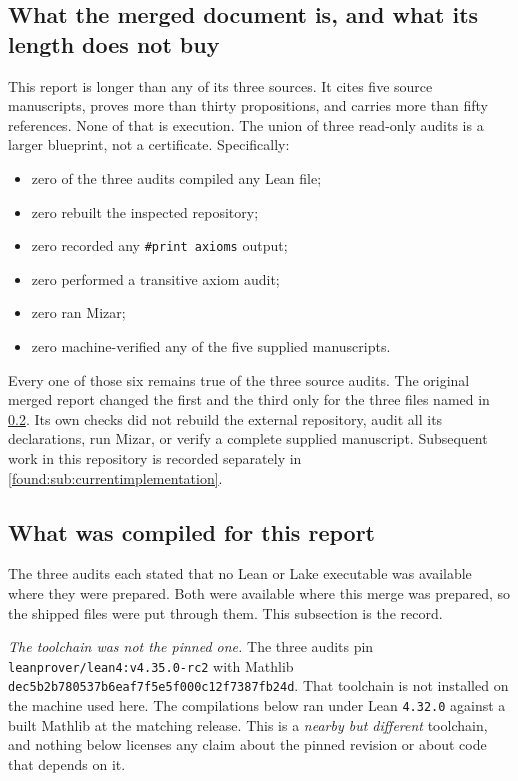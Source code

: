 \documentclass[11pt,letterpaper]{article}
\numberwithin{equation}{section}
\theoremstyle{definition}
\theoremstyle{remark}
\begin{document}
\subsection{What the merged document is, and what its length does not buy}
\label{found:sub:notacertificate}
This report is longer than any of its three sources. It cites five source
manuscripts, proves more than thirty propositions, and carries more than fifty
references. None of that is execution. The union of three read-only audits is a
larger blueprint, not a certificate. Specifically:

\begin{itemize}
\item zero of the three audits compiled any Lean file;
\item zero rebuilt the inspected repository;
\item zero recorded any \texttt{\#print axioms} output;
\item zero performed a transitive axiom audit;
\item zero ran Mizar;
\item zero machine-verified any of the five supplied manuscripts.
\end{itemize}

\noindent Every one of those six remains true of the three source audits. The original
merged report changed the first and the third only for the three files named in
\cref{found:sub:compiled}. Its own checks did not rebuild the external
repository, audit all its declarations, run Mizar, or verify a complete supplied
manuscript. Subsequent work in this repository is recorded separately in
\cref{found:sub:currentimplementation}.

\subsection{What was compiled for this report}
\label{found:sub:compiled}

The three audits each stated that no Lean or Lake executable was available where
they were prepared. Both were available where this merge was prepared, so the
shipped files were put through them. This subsection is the record.

\emph{The toolchain was not the pinned one.} The three audits pin
\texttt{leanprover/lean4:v4.35.0-rc2} with Mathlib
\texttt{dec5b2b780537b6eaf7f5e5f000c12f7387fb24d}. That toolchain is not
installed on the machine used here. The compilations below ran under Lean
\texttt{4.32.0} against a built Mathlib at the matching release. This is a
\emph{nearby but different} toolchain, and nothing below licenses any claim
about the pinned revision or about code that depends on it.
\end{document}
